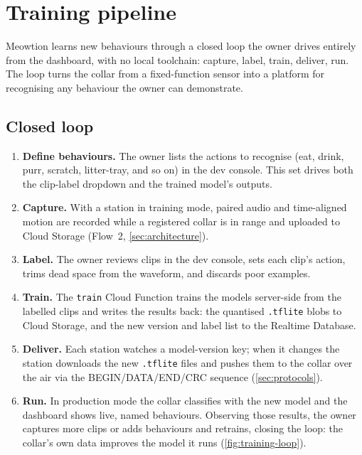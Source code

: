 \section{Training pipeline}
\label{sec:training-pipeline}

Meowtion learns new behaviours through a closed loop the owner drives entirely from the dashboard,
with no local toolchain: capture, label, train, deliver, run. The loop turns the collar from a
fixed-function sensor into a platform for recognising any behaviour the owner can demonstrate.

\subsection{Closed loop}

\begin{enumerate}[leftmargin=1.6em,itemsep=2pt]
  \item \textbf{Define behaviours.} The owner lists the actions to recognise (eat, drink, purr,
        scratch, litter-tray, and so on) in the dev console. This set drives both the clip-label
        dropdown and the trained model's outputs.
  \item \textbf{Capture.} With a station in training mode, paired audio and time-aligned motion are
        recorded while a registered collar is in range and uploaded to Cloud Storage (Flow~2,
        \cref{sec:architecture}).
  \item \textbf{Label.} The owner reviews clips in the dev console, sets each clip's action, trims
        dead space from the waveform, and discards poor examples.
  \item \textbf{Train.} The \texttt{train} Cloud Function trains the models server-side from the
        labelled clips and writes the results back: the quantised \texttt{.tflite} blobs to Cloud
        Storage, and the new version and label list to the Realtime Database.
  \item \textbf{Deliver.} Each station watches a model-version key; when it changes the station
        downloads the new \texttt{.tflite} files and pushes them to the collar over the air via the
        BEGIN/DATA/END/CRC sequence (\cref{sec:protocols}).
  \item \textbf{Run.} In production mode the collar classifies with the new model and the dashboard
        shows live, named behaviours. Observing those results, the owner captures more clips or adds
        behaviours and retrains, closing the loop: the collar's own data improves the model it runs
        (\cref{fig:training-loop}).
\end{enumerate}

